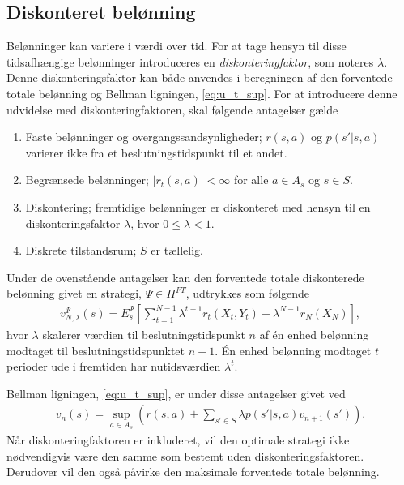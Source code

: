 \subsection{Diskonteret belønning}
Belønninger kan variere i værdi over tid. For at tage hensyn til disse tidsafhængige belønninger introduceres en \textit{diskonteringfaktor}, som noteres $\lambda$. Denne diskonteringsfaktor kan både anvendes i beregningen af den forventede totale belønning og Bellman ligningen, \ref{eq:u_t_sup}. For at introducere denne udvidelse med diskonteringfaktoren, skal følgende antagelser gælde

\begin{enumerate}
    \item Faste belønninger og overgangssandsynligheder; $r(s,a)$ og $p(s'|s,a)$ varierer ikke fra et beslutningstidspunkt til et andet.
    \item Begrænsede belønninger; $|r_t(s,a)| < \infty$ for alle $a\in A_s$ og $s\in S$.
    \item Diskontering; fremtidige belønninger er diskonteret med hensyn til en diskonteringsfaktor $\lambda$, hvor $0 \leq \lambda < 1$.
    \item Diskrete tilstandsrum; $S$ er tællelig.
\end{enumerate}

Under de ovenstående antagelser kan den forventede totale diskonterede belønning givet en strategi, $\Psi\in \Pi^{FT}$, udtrykkes som følgende 
\begin{align*}
    v_{N,\lambda}^\Psi(s)=E_s^\Psi\left[\sum_{t=1}^{N-1}\lambda^{t-1}r_t(X_t, Y_t)+\lambda^{N-1}r_N(X_N)\right],
\end{align*}
hvor $\lambda$ skalerer værdien til beslutningstidspunkt $n$ af én enhed belønning modtaget til beslutningstidspunktet $n+1$. Én enhed belønning modtaget $t$ perioder ude i fremtiden har nutidsværdien $\lambda^t$.

Bellman ligningen, \eqref{eq:u_t_sup}, er under disse antagelser givet ved
\begin{align*}
    v_n(s) = \sup_{a \in A_s} \left( r(s,a) + \sum_{s'\in S} \lambda p\left(s'|s,a\right)v_{n+1}(s')\right).
\end{align*}
Når diskonteringfaktoren er inkluderet, vil den optimale strategi ikke nødvendigvis være den samme som bestemt uden diskonteringsfaktoren. Derudover vil den også påvirke den maksimale forventede totale belønning. 

